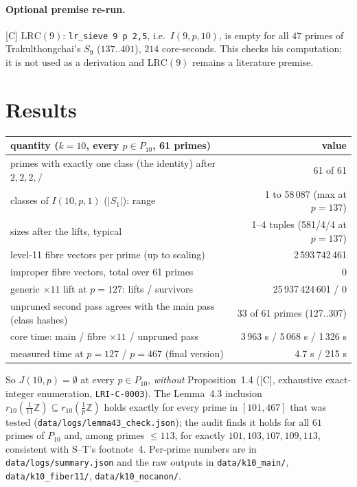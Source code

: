 \documentclass[10pt]{article}
\newcommand{\tier}[1]{\textsf{[#1]}}
\newcommand{\tC}{\tier{C}}
\newcommand{\Z}{\mathbb{Z}}
\newcommand{\LRC}[1]{\mathrm{LRC}(#1)}
\begin{document}
\paragraph{Optional premise re-run.}\tC{} $\LRC{9}$: \texttt{lr\_sieve 9 p 2,5}, i.e.\ $I(9,p,10)$, is empty for all $47$ primes of Trakulthongchai's $S_9$ ($137..401$), $214$ core-seconds. This checks his computation; it is not used as a derivation and $\LRC{9}$ remains a literature premise.

\section{Results}\label{sec:results}
\begin{center}\small\begin{tabular}{p{9.2cm}r}\toprule
quantity ($k=10$, every $p\in P_{10}$, 61 primes) & value\\\midrule
primes with exactly one class (the identity) after $2,2,2,/$ & 61 of 61\\
classes of $I(10,p,1)$ ($|S_1|$): range & 1 to 58\,087 (max at $p=137$)\\
sizes after the lifts, typical & 1--4 tuples (581/4/4 at $p=137$)\\
level-11 fibre vectors per prime (up to scaling) & 2\,593\,742\,461\\
improper fibre vectors, total over 61 primes & 0\\
generic $\times11$ lift at $p=127$: lifts / survivors & 25\,937\,424\,601 / 0\\
unpruned second pass agrees with the main pass (class hashes) & 33 of 61 primes (127..307)\\
core time: main / fibre $\times11$ / unpruned pass & 3\,963 s / 5\,068 s / 1\,326 s\\
measured time at $p=127$ / $p=467$ (final version) & 4.7 s / 215 s\\\bottomrule
\end{tabular}\end{center}
So $J(10,p)=\emptyset$ at every $p\in P_{10}$, \emph{without} Proposition~1.4 (\tC{}, exhaustive exact-integer enumeration, \texttt{LRI-C-0003}). The Lemma~4.3 inclusion $r_{10}(\tfrac1{11}\Z)\subseteq r_{10}(\tfrac1p\Z)$ holds exactly for every prime in $[101,467]$ that was tested (\texttt{data/logs/lemma43\_check.json}); the audit finds it holds for all $61$ primes of $P_{10}$ and, among primes $\le113$, for exactly $101,103,107,109,113$, consistent with S--T's footnote~4.
Per-prime numbers are in \texttt{data/logs/summary.json} and the raw outputs in \texttt{data/k10\_main/}, \texttt{data/k10\_fiber11/}, \texttt{data/k10\_nocanon/}.
\end{document}
